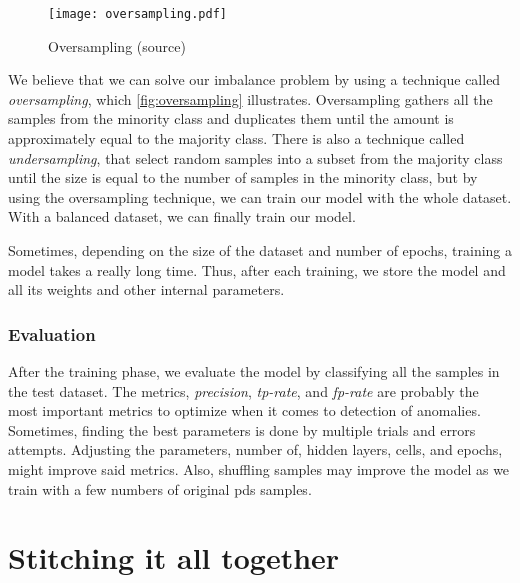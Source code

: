 \begin{figure}[ht]
    \centering
    \texttt{[image: oversampling.pdf]}
    \caption{Oversampling (source\cite{tw_imbalance})}
    \label{fig:oversampling}
\end{figure}

We believe that we can solve our imbalance problem by using a technique called \emph{oversampling}, which \autoref{fig:oversampling} illustrates. Oversampling gathers all the samples from the minority class and duplicates them until the amount is approximately equal to the majority class. There is also a technique called \emph{undersampling}, that select random samples into a subset from the majority class until the size is equal to the number of samples in the minority class, but by using the oversampling technique, we can train our model with the whole dataset. With a balanced dataset, we can finally train our model.

Sometimes, depending on the size of the dataset and number of epochs, training a model takes a really long time. Thus, after each training, we store the model and all its weights and other internal parameters.

\subsubsection{Evaluation}
After the training phase, we evaluate the model by classifying all the samples in the test dataset. The metrics, \emph{precision}, \emph{tp-rate}, and \emph{fp-rate} are probably the most important metrics to optimize when it comes to detection of anomalies. Sometimes, finding the best parameters is done by multiple trials and errors attempts. Adjusting the parameters, number of, hidden layers, cells, and epochs, might improve said metrics. Also, shuffling samples may improve the model as we train with a few numbers of original \acp{pd} samples.

\section{Stitching it all together}
